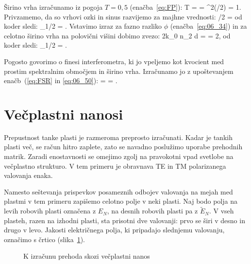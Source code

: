 Širino vrha izračunamo iz pogoja $T=0,5$ (enačba~\ref{eq:FP}):
\beq
T =  =  \qquad
\Longrightarrow \qquad {} \sin^2(\phi/2) = 1.
\label{eq:06_46}
\eeq
Privzamemo, da so vrhovi ozki in sinus razvijemo za majhne vrednosti:
\beq
\phi/2 = 
\label{eq:06_47}
\eeq
od koder sledi:
\beq
\phi_{1/2} = .
\label{eq:06_48}
\eeq
Vstavimo izraz za fazno razliko $\phi$ (enačba~\ref{eq:06_34}) in 
za celotno širino vrha na polovični višini dobimo zvezo:
\beq
2k_0 n_2 d =  = 2,
\label{eq:06_49}
\eeq
od koder sledi:
\beq
\delta \nu_{1/2} =  .
\label{eq:06_50}
\eeq
\begin{remark}
Pogosto govorimo o finesi interferometra, ki jo vpeljemo kot
kvocient med prostim spektralnim območjem in širino vrha. Izračunamo jo 
z upoštevanjem enačb~(\ref{eq:FSR} in \ref{eq:06_50}):
\beq
{} =   = .
\label{eq:06_51}
\eeq
\end{remark}

\section{Večplastni nanosi}
Prepustnost tanke plasti je razmeroma preprosto izračunati. Kadar je 
tankih plasti več, se račun hitro zaplete, zato se navadno poslužimo 
uporabe prehodnih matrik. Zaradi enostavnosti se omejimo zgolj na pravokotni 
vpad svetlobe na večplastno strukturo. V tem primeru je obravnava TE in TM
polarizanega valovanja enaka. 

Namesto seštevanja prispevkov posameznih odbojev valovanja na mejah med plastmi 
v tem primeru zapišemo celotno polje v neki plasti. Naj bodo polja na levih 
robovih plasti označena z $E_N$, na desnih robovih plasti pa z $\tilde{E}_N$. 
V vseh plasteh, razen na izhodni plasti, sta prisotni dve valovanji: prvo se širi
v desno in drugo v levo. Jakosti električnega polja, ki pripadajo slednjemu
valovanju, označimo s črtico (slika~\ref{fig:06_prehodneM}).
\begin{figure}[ht]
\centering
\def\svgwidth{100truemm} 

\caption{K izračunu prehoda skozi večplastni nanos}
\label{fig:06_prehodneM}
\end{figure}

